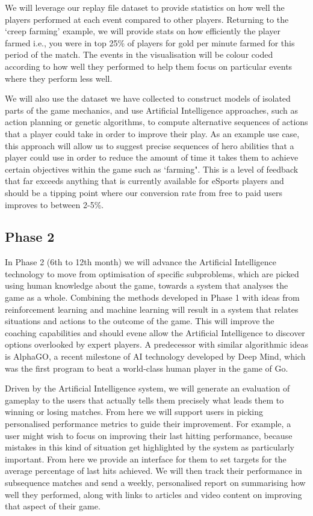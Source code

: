 \documentclass[12pt]{article} %
\begin{document}
We will leverage our replay file dataset to provide statistics on how well the players performed at each event compared to other players. Returning to the `creep farming' example, we will provide stats on how efficiently the player farmed i.e., you were in top 25\% of players for gold per minute farmed for this period of the match. The events in the visualisation will be colour coded according to how well they performed to help them focus on particular events where they perform less well.

We will also use the dataset we have collected to construct models of isolated parts of the game mechanics, and use Artificial Intelligence approaches, such as action planning or genetic algorithms, to compute alternative sequences of actions that a player could take in order to improve their play. As an example use case, this approach will allow us to suggest precise sequences of hero abilities that a player could use in order to reduce the amount of time it takes them to achieve certain objectives within the game such as `farming". This is a level of feedback that far exceeds anything that is currently available for eSports players and should be a tipping point where our conversion rate from free to paid users improves to between 2-5\%.

\subsection{Phase 2}

In Phase 2 (6th to 12th month) we will advance the Artificial Intelligence technology to move from optimisation of specific subproblems, which are picked using human knowledge about the game, towards a system that analyses the game as a whole. Combining the methods developed in Phase 1 with ideas from reinforcement learning and machine learning will result in a system that relates situations and actions to the outcome of the game. This will improve the coaching capabilities and should evene allow the Artificial Intelligence to discover options overlooked by expert players. A predecessor with similar algorithmic ideas is AlphaGO, a recent milestone of AI technology developed by Deep Mind, which was the first program to beat a world-class human player in the game of Go.

Driven by the Artificial Intelligence system, we will generate an evaluation of gameplay to the users that actually tells them precisely what leads them to winning or losing matches. From here we will support users in picking personalised performance metrics to guide their improvement. For example, a user might wish to focus on improving their last hitting performance, because mistakes in this kind of situation get highlighted by the system as particularly important. From here we provide an interface for them to set targets for the average percentage of last hits achieved. We will then track their performance in subsequence matches and send a weekly, personalised report on summarising how well they performed, along with links to articles and video content on improving that aspect of their game.
\end{document}
